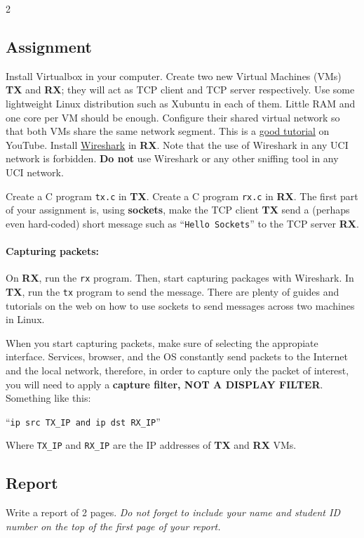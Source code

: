 \documentclass[12pt]{article}
\begin{document}
\begin{multicols}{2}
\subsection*{Assignment}
Install Virtualbox in your computer.
Create two new Virtual Machines (VMs) \textbf{TX} and \textbf{RX}; they will act as TCP client and TCP server respectively.
Use some lightweight Linux distribution such as Xubuntu in each of them. Little RAM and one core per VM should be enough.
Configure their shared virtual network so that both VMs share the same network segment. This is a \href{https://youtu.be/vReAkOq-59I}{good tutorial} on YouTube.
Install \href{https://www.wireshark.org/docs/}{Wireshark} in \textbf{RX}. {\color{red}Note that the use of Wireshark in any UCI network is forbidden. \textbf{Do not} use Wireshark or any other sniffing tool in any UCI network.}

Create a C program \texttt{tx.c} in \textbf{TX}.
Create a C program \texttt{rx.c} in \textbf{RX}.
The first part of your assignment is, using \textbf{sockets}, make the TCP client \textbf{TX} send a (perhaps even hard-coded) short message such as ``\texttt{Hello Sockets}'' to the TCP server \textbf{RX}.


\paragraph{Capturing packets:}
On \textbf{RX}, run the \texttt{rx} program. Then, start capturing packages with Wireshark.
In \textbf{TX}, run the \texttt{tx} program to send the message.
There are plenty of guides and tutorials on the web on how to use sockets to send messages across two machines in Linux.

When you start capturing packets, make sure of selecting the appropiate interface. Services, browser, and the OS constantly send packets to the Internet and the local network, therefore, in order to capture only the packet of interest, you will need to apply a \textbf{capture filter, NOT A DISPLAY FILTER}. Something like this:

\centerline{``\texttt{ip src TX\_IP and ip dst RX\_IP}''}
  
Where \texttt{TX\_IP} and \texttt{RX\_IP} are the IP addresses of \textbf{TX} and \textbf{RX} VMs.

\subsection*{Report}
Write a report of 2 pages. {\em Do not forget to include your name and student ID number on the top of the first page of your report.}


\end{multicols}
\end{document}
